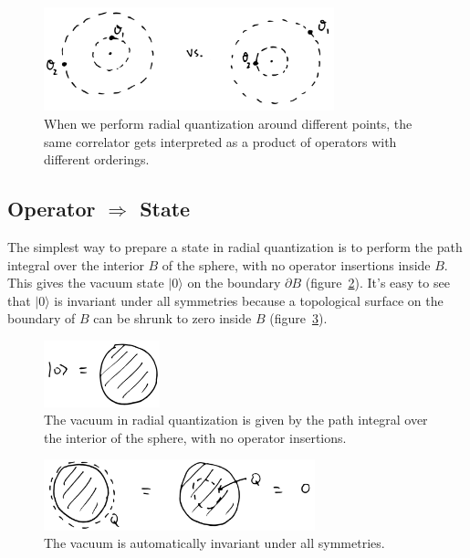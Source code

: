 \documentclass[11pt]{ws-rv9x6}
\newcommand\ptl\partial
\newcommand\<\langle
\renewcommand\>\rangle
\renewcommand\.{\cdot}
\begin{document}
\begin{figure}
\begin{center}
\includegraphics[width=0.75\textwidth]{radialquantdifferentpoints.jpg}
\end{center}
\caption{When we perform radial quantization around different points, the same correlator gets interpreted as a product of operators with different orderings.  \label{fig:radialquantdifferentpoints}}
\end{figure}

\subsection{Operator $\Longrightarrow$ State}
\label{sec:operatorimpliesstate}

The simplest way to prepare a state in radial quantization is to perform the path integral over the interior $B$ of the sphere, with no operator insertions inside $B$.  This gives the vacuum state $|0\>$ on the boundary $\ptl B$ (figure~\ref{fig:radialvacuum.jpg}).  It's easy to see that $|0\>$ is invariant under all symmetries because a topological surface on the boundary of $B$ can be shrunk to zero inside $B$ (figure~\ref{fig:vacuuminvariant}).

\begin{figure}
\begin{center}
\includegraphics[width=0.3\textwidth]{radialvacuum.jpg}
\end{center}
\caption{The vacuum in radial quantization is given by the path integral over the interior of the sphere, with no operator insertions.  \label{fig:radialvacuum.jpg}}
\end{figure}

\begin{figure}
\begin{center}
\includegraphics[width=0.7\textwidth]{vacuuminvariant.jpg}
\end{center}
\caption{The vacuum is automatically invariant under all symmetries.  \label{fig:vacuuminvariant}}
\end{figure}
\end{document}
